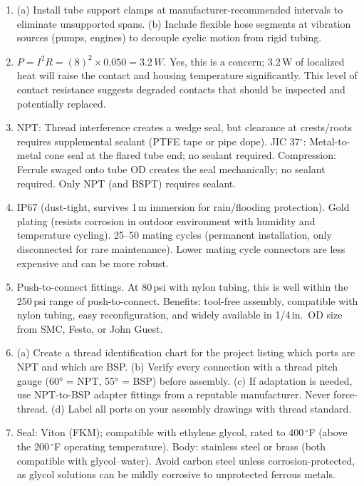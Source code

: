 \begin{enumerate}[leftmargin=1.5em]
  \item (a) Install tube support clamps at manufacturer-recommended intervals to eliminate unsupported spans. (b) Include flexible hose segments at vibration sources (pumps, engines) to decouple cyclic motion from rigid tubing.

  \item $P = I^2R = (8)^2 \times 0.050 = 3.2\,W$. Yes, this is a concern; 3.2\,W of localized heat will raise the contact and housing temperature significantly. This level of contact resistance suggests degraded contacts that should be inspected and potentially replaced.

  \item NPT: Thread interference creates a wedge seal, but clearance at crests/roots requires supplemental sealant (PTFE tape or pipe dope). JIC 37$^{\circ}$: Metal-to-metal cone seal at the flared tube end; no sealant required. Compression: Ferrule swaged onto tube OD creates the seal mechanically; no sealant required. Only NPT (and BSPT) requires sealant.

  \item IP67 (dust-tight, survives 1\,m immersion for rain/flooding protection). Gold plating (resists corrosion in outdoor environment with humidity and temperature cycling). 25--50 mating cycles (permanent installation, only disconnected for rare maintenance). Lower mating cycle connectors are less expensive and can be more robust.

  \item Push-to-connect fittings. At 80\,psi with nylon tubing, this is well within the 250\,psi range of push-to-connect. Benefits: tool-free assembly, compatible with nylon tubing, easy reconfiguration, and widely available in 1/4\,in.\ OD size from SMC, Festo, or John Guest.

  \item (a) Create a thread identification chart for the project listing which ports are NPT and which are BSP. (b) Verify every connection with a thread pitch gauge (\ang{60} = NPT, \ang{55} = BSP) before assembly. (c) If adaptation is needed, use NPT-to-BSP adapter fittings from a reputable manufacturer. Never force-thread. (d) Label all ports on your assembly drawings with thread standard.

  \item Seal: Viton (FKM); compatible with ethylene glycol, rated to 400\,$^{\circ}$F (above the 200\,$^{\circ}$F operating temperature). Body: stainless steel or brass (both compatible with glycol--water). Avoid carbon steel unless corrosion-protected, as glycol solutions can be mildly corrosive to unprotected ferrous metals.


\end{enumerate}
